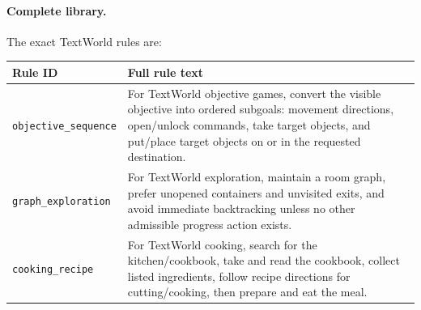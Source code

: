\documentclass[11pt]{article}
\begin{document}
\paragraph{Complete library.}
The exact TextWorld rules are:
\begin{center}
\scriptsize
\setlength{\tabcolsep}{3pt}
\begin{tabular}{p{}p{}}
\toprule
Rule ID & Full rule text \\
\midrule
\texttt{objective\_sequence} & For TextWorld objective games, convert the visible objective into ordered subgoals: movement directions, open/unlock commands, take target objects, and put/place target objects on or in the requested destination. \\
\texttt{graph\_exploration} & For TextWorld exploration, maintain a room graph, prefer unopened containers and unvisited exits, and avoid immediate backtracking unless no other admissible progress action exists. \\
\texttt{cooking\_recipe} & For TextWorld cooking, search for the kitchen/cookbook, take and read the cookbook, collect listed ingredients, follow recipe directions for cutting/cooking, then prepare and eat the meal. \\
\bottomrule
\end{tabular}
\end{center}
\end{document}
